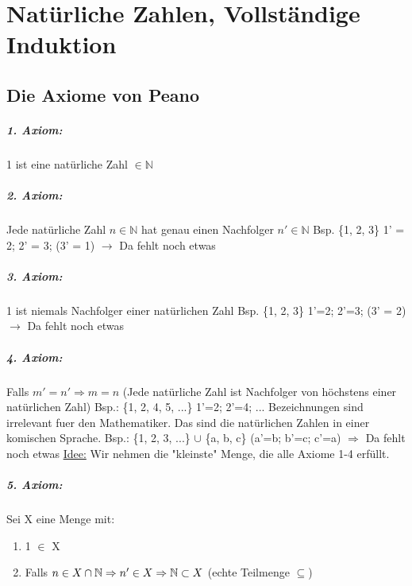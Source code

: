 \chapter{Natürliche Zahlen, Vollständige Induktion}

\section{Die Axiome von Peano}
\paragraph{1. Axiom:}
1 ist eine natürliche Zahl $\in \mathbb{N}$

\paragraph{2. Axiom:}
Jede natürliche Zahl $n \in \mathbb{N}$ hat genau einen Nachfolger $n' \in \mathbb{N}$\newline
Bsp. \{1, 2, 3\} 1' = 2; 2' = 3; (3' = 1) $\rightarrow$ Da fehlt noch etwas

\paragraph{3. Axiom:}
1 ist niemals Nachfolger einer natürlichen Zahl\newline
Bsp. \{1, 2, 3\} 1'=2; 2'=3; (3' = 2) $\rightarrow$ Da fehlt noch etwas

\paragraph{4. Axiom:}
Falls $m'=n' \Rightarrow m=n$ (Jede natürliche Zahl ist Nachfolger von höchstens einer natürlichen Zahl)\newline
Bsp.: \{1, 2, 4, 5, ...\}  1'=2; 2'=4; ... Bezeichnungen sind irrelevant fuer den Mathematiker. Das sind die natürlichen Zahlen in einer komischen Sprache.\newline
Bsp.: \{1, 2, 3, ...\} $\cup$ \{a, b, c\} (a'=b; b'=c; c'=a) $\Rightarrow$ Da fehlt noch etwas\newline
\underline{Idee:} Wir nehmen die "kleinste" Menge, die alle Axiome 1-4 erfüllt.

\paragraph{5. Axiom:}
Sei X eine Menge mit:
\begin{enumerate}
\item 1 $\in$ X
\item Falls $n \in X \cap \mathbb{N} \Rightarrow n' \in X \newline \Rightarrow \mathbb{N} \subset X$ (echte Teilmenge $\subseteq$)
\end{enumerate}

